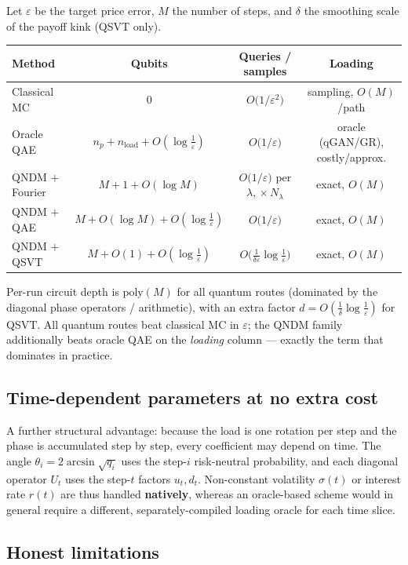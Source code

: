 \documentclass{article}
\begin{document}
Let $\varepsilon$ be the target price error, $M$ the number of steps, and $\delta$ the smoothing scale of the payoff kink (QSVT only).
\begin{center}
\renewcommand{\arraystretch}{1.4}
\begin{tabular}{|l|c|c|c|}
\hline
\textbf{Method} & \textbf{Qubits} & \textbf{Queries / samples} & \textbf{Loading} \\
\hline
Classical MC & $0$ & $O\!\big(1/\varepsilon^2\big)$ & sampling, $O(M)$/path \\
Oracle QAE \cite{Stamatopoulos_2020} & $n_p+n_{\text{load}}+O(\log\tfrac1\varepsilon)$ & $O\!\big(1/\varepsilon\big)$ & oracle (qGAN/GR), costly/approx. \\
QNDM $+$ Fourier & $M+1+O(\log M)$ & $O\!\big(1/\varepsilon\big)$ per $\lambda$, $\times\,N_\lambda$ & exact, $O(M)$ \\
QNDM $+$ QAE & $M+O(\log M)+O(\log\tfrac1\varepsilon)$ & $O\!\big(1/\varepsilon\big)$ & exact, $O(M)$ \\
QNDM $+$ QSVT & $M+O(1)+O(\log\tfrac1\varepsilon)$ & $O\!\big(\tfrac{1}{\delta\varepsilon}\log\tfrac1\varepsilon\big)$ & exact, $O(M)$ \\
\hline
\end{tabular}
\end{center}
Per-run circuit depth is $\mathrm{poly}(M)$ for all quantum routes (dominated by the diagonal phase operators / arithmetic), with an extra factor $d=O(\tfrac1\delta\log\tfrac1\varepsilon)$ for QSVT. All quantum routes beat classical MC in $\varepsilon$; the QNDM family additionally beats oracle QAE on the \emph{loading} column --- exactly the term that dominates in practice.

\subsection{Time-dependent parameters at no extra cost}

A further structural advantage: because the load is one rotation per step and the phase is accumulated step by step, every coefficient may depend on time. The angle $\theta_i=2\arcsin\sqrt{q_i}$ uses the step-$i$ risk-neutral probability, and each diagonal operator $U_t$ uses the step-$t$ factors $u_t,d_t$. Non-constant volatility $\sigma(t)$ or interest rate $r(t)$ are thus handled \textbf{natively}, whereas an oracle-based scheme would in general require a different, separately-compiled loading oracle for each time slice.

\subsection{Honest limitations}
\end{document}
